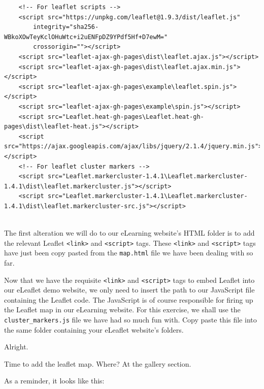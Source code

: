 \documentclass[
]{book}
\begin{document}
\begin{verbatim}
    <!-- For leaflet scripts -->
    <script src="https://unpkg.com/leaflet@1.9.3/dist/leaflet.js"
        integrity="sha256-WBkoXOwTeyKclOHuWtc+i2uENFpDZ9YPdf5Hf+D7ewM="
        crossorigin=""></script>
    <script src="leaflet-ajax-gh-pages\dist\leaflet.ajax.js"></script>
    <script src="leaflet-ajax-gh-pages\dist\leaflet.ajax.min.js"></script>
    <script src="leaflet-ajax-gh-pages\example\leaflet.spin.js"></script>
    <script src="leaflet-ajax-gh-pages\example\spin.js"></script> 
    <script src="Leaflet.heat-gh-pages\Leaflet.heat-gh-pages\dist\leaflet-heat.js"></script>
    <script src="https://ajax.googleapis.com/ajax/libs/jquery/2.1.4/jquery.min.js"></script>
    <!-- For leaflet cluster markers -->
    <script src="Leaflet.markercluster-1.4.1\Leaflet.markercluster-1.4.1\dist\leaflet.markercluster.js"></script>
    <script src="Leaflet.markercluster-1.4.1\Leaflet.markercluster-1.4.1\dist\leaflet.markercluster-src.js"></script>
    
\end{verbatim}

The first alteration we will do to our eLearning website's HTML folder is to add the relevant Leaflet \texttt{\textless{}link\textgreater{}} and \texttt{\textless{}script\textgreater{}} tags. These \texttt{\textless{}link\textgreater{}} and \texttt{\textless{}script\textgreater{}} tags have just been copy pasted from the \texttt{map.html} file we have been dealing with so far.

Now that we have the requisite \texttt{\textless{}link\textgreater{}} and \texttt{\textless{}script\textgreater{}} tags to embed Leaflet into our eLeaflet demo website, we only need to insert the path to our JavaScript file containing the Leaflet code. The JavaScript is of course responsible for firing up the Leaflet map in our eLearning website. For this exercise, we shall use the \texttt{cluster\_markers.js} file we have had so much fun with. Copy paste this file into the same folder containing your eLeaflet website's folders.

Alright.

Time to add the leaflet map. Where? At the gallery section.

As a reminder, it looks like this:
\end{document}
